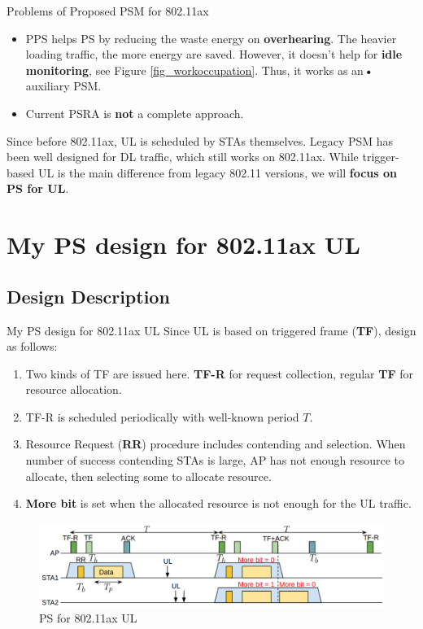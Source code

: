 \documentclass[10pt]{beamer}
\begin{document}
\begin{frame}{Problems of Proposed PSM for 802.11ax}
\begin{itemize}
\item
PPS helps PS by reducing the waste energy on \textbf{overhearing}. The heavier loading traffic, the more energy are saved. 
However, it doesn't help for \textbf{idle monitoring}, see Figure \ref{fig_workoccupation}. 
Thus, it works as an\textbf{•} auxiliary PSM. 
\item
Current PSRA is \textbf{not} a complete approach. 
\end{itemize}
Since before 802.11ax, UL is scheduled by STAs themselves. 
Legacy PSM has been well designed for DL traffic, which still works on 802.11ax. 
While trigger-based UL is the main difference from legacy 802.11 versions, we will \textbf{focus on PS for UL}.
\end{frame}

\section{My PS design for 802.11ax UL}
\subsection{Design Description}
\begin{frame}{My PS design for 802.11ax UL}
    Since UL is based on triggered frame (\textbf{TF}), design as follows:
    \begin{enumerate}
    \item
    Two kinds of TF are issued here. \textbf{TF-R} for request collection, regular \textbf{TF} for resource allocation.
    \item
    TF-R is scheduled periodically with well-known period $T$.
    \item
    Resource Request (\textbf{RR}) procedure includes contending and selection. 
    When number of success contending STAs is large, AP has not enough resource to allocate, then selecting some to allocate resource. 
    \item
    \textbf{More bit} is set when the allocated resource is not enough for the UL traffic.  
    \end{enumerate}
	    
    \begin{figure}
    \includegraphics[scale=0.25]{./figure/ps_ax.png}
    \caption{PS for 802.11ax UL}
    \label{ps_ax}
    \end{figure}
\end{frame}
\end{document}
